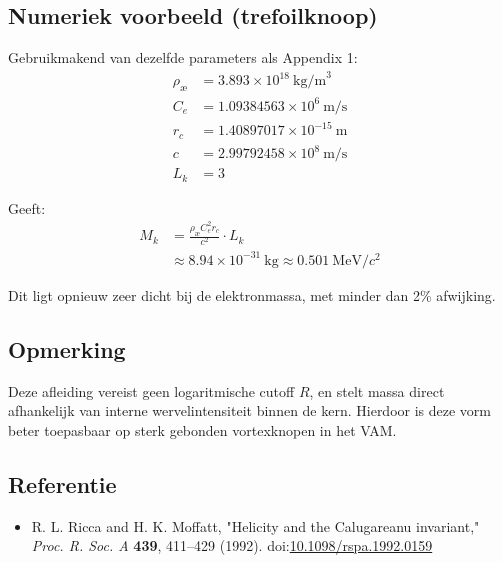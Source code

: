 \subsection*{Numeriek voorbeeld (trefoilknoop)}
Gebruikmakend van dezelfde parameters als Appendix 1:
\begin{align*}
    \rho_\text{\ae} &= 3.893 \times 10^{18}~\text{kg/m}^3 \\
    C_e &= 1.09384563 \times 10^6~\text{m/s} \\
    r_c &= 1.40897017 \times 10^{-15}~\text{m} \\
    c &= 2.99792458 \times 10^8~\text{m/s} \\
    L_k &= 3
\end{align*}

Geeft:
\begin{align*}
    M_k &= \frac{\rho_\text{\ae} C_e^2 r_c}{c^2} \cdot L_k \\
    &\approx 8.94 \times 10^{-31}~\text{kg} \approx 0.501~\text{MeV}/c^2
\end{align*}

Dit ligt opnieuw zeer dicht bij de elektronmassa, met minder dan 2\% afwijking.

\subsection*{Opmerking}
Deze afleiding vereist geen logaritmische cutoff \( R \), en stelt massa direct afhankelijk van interne wervelintensiteit binnen de kern. Hierdoor is deze vorm beter toepasbaar op sterk gebonden vortexknopen in het VAM.

\subsection*{Referentie}
\begin{itemize}
    \item R. L. Ricca and H. K. Moffatt, "Helicity and the Calugareanu invariant," \textit{Proc. R. Soc. A} \textbf{439}, 411--429 (1992). doi:\href{https://doi.org/10.1098/rspa.1992.0159}{10.1098/rspa.1992.0159}
\end{itemize}